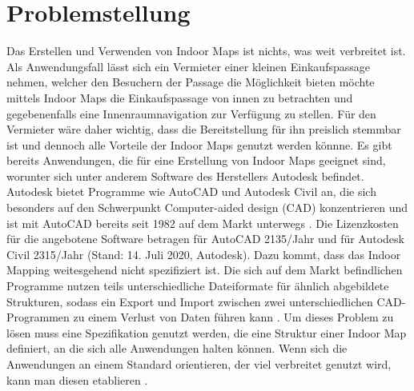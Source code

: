 \section{Problemstellung}
Das Erstellen und Verwenden von Indoor Maps ist nichts, was weit verbreitet ist.
Als Anwendungsfall lässt sich ein Vermieter einer kleinen Einkaufspassage nehmen, welcher den Besuchern der Passage die Möglichkeit bieten möchte mittels Indoor Maps die Einkaufspassage von innen zu betrachten und gegebenenfalls eine Innenraumnavigation zur Verfügung zu stellen.
Für den Vermieter wäre daher wichtig, dass die Bereitstellung für ihn preislich stemmbar ist und dennoch alle Vorteile der Indoor Maps genutzt werden könnne.\pbreak%
%
Es gibt bereits Anwendungen, die für eine Erstellung von Indoor Maps geeignet sind, worunter sich unter anderem Software des Herstellers Autodesk befindet.
Autodesk bietet Programme wie AutoCAD und Autodesk Civil an, die sich besonders auf den Schwerpunkt Computer-aided design (CAD) konzentrieren und ist mit AutoCAD bereits seit 1982 auf dem Markt unterwegs \parencite{HUR2008}.
Die Lizenzkosten für die angebotene Software betragen für AutoCAD \SI{2135}{\eur}/Jahr und für Autodesk Civil \SI{2315}{\eur}/Jahr (Stand: 14. Juli 2020, Autodesk).\pbreak%
%
Dazu kommt, dass das Indoor Mapping weitesgehend nicht spezifiziert ist.
Die sich auf dem Markt befindlichen Programme nutzen teils unterschiedliche Dateiformate für ähnlich abgebildete Strukturen, sodass ein Export und Import zwischen zwei unterschiedlichen CAD-Programmen zu einem Verlust von Daten führen kann \parencite{GEL2019}.
Um dieses Problem zu lösen muss eine Spezifikation genutzt werden, die eine Struktur einer Indoor Map definiert, an die sich alle Anwendungen halten können.
Wenn sich die Anwendungen an einem Standard orientieren, der viel verbreitet genutzt wird, kann man diesen etablieren \parencite{GEL2019}.

